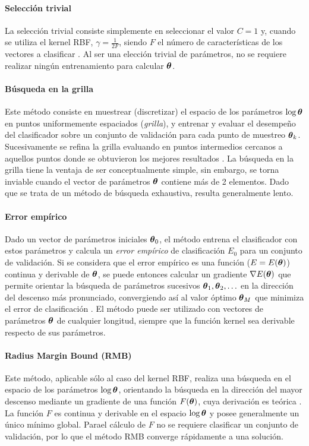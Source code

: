 \documentclass[12pt,bibliography=oldstyle,DIV=12,parskip=half-]{scrreprt}
\begin{document}
\paragraph{Selección trivial}
La selección trivial consiste simplemente en seleccionar el valor
$C=1$ y, cuando se utiliza el kernel RBF, $\gamma=\frac{1}{2F}$,
siendo $F$ el número de características de los vectores a clasificar
\cite{glasmachersigel}. Al ser una elección trivial de parámetros, no
se requiere realizar ningún entrenamiento para calcular $\boldsymbol{\theta}$.
%
%
\paragraph{Búsqueda en la grilla}
Este método consiste en muestrear (discretizar) el espacio de los
parámetros $\log\boldsymbol{\theta}$ en puntos uniformemente espaciados
(\emph{grilla}), y entrenar y evaluar el desempeño del clasificador
sobre un conjunto de validación para cada punto de muestreo
$\boldsymbol{\theta}_k$.  Sucesivamente se refina la grilla evaluando en puntos
intermedios cercanos a aquellos puntos donde se obtuvieron los mejores
resultados \cite{hsu}.
La búsqueda en la grilla tiene la ventaja de ser conceptualmente
simple, sin embargo, se torna inviable cuando el vector de parámetros
$\boldsymbol{\theta}$ contiene más de 2 elementos. Dado que se trata de un
método de búsqueda exhaustiva, resulta generalmente lento.
%
%
\paragraph{Error empírico}
Dado un vector de parámetros iniciales $\boldsymbol{\theta}_0$, el método
entrena el clasificador con estos parámetros y calcula un \emph{error
  empírico} de clasificación $E_0$ \cite{ayat} para un conjunto de validación.
Si
se considera que el error empírico es una función ($E=E(\boldsymbol{\theta})$) continua y
derivable de $\boldsymbol{\theta}$, se puede entonces calcular un gradiente
$\nabla E(\boldsymbol{\theta})$ \cite{keerthi} %
que permite orientar la búsqueda de parámetros sucesivos
$\boldsymbol{\theta}_1,\boldsymbol{\theta}_2,\ldots$ en la dirección del descenso más pronunciado,
convergiendo así al valor óptimo $\boldsymbol{\theta}_M$ que minimiza el error
de clasificación \cite{adankon,glasmachersigel}.
El método puede ser utilizado con vectores de parámetros
$\boldsymbol{\theta}$ de cualquier longitud, siempre que la función kernel sea
derivable respecto de sus parámetros.
%
%
\paragraph{Radius Margin Bound (RMB)}
Este método, aplicable sólo al caso del kernel RBF, realiza una
búsqueda en el espacio de los parámetros $\log\boldsymbol{\theta}$, orientando
la búsqueda en la dirección del mayor descenso mediante un gradiente
de una función $F(\boldsymbol{\theta})$, cuya derivación es teórica \cite{chung}.
La función $F$ es continua y derivable en el espacio $\log\boldsymbol\theta$
y posee generalmente un único mínimo global. Parael cálculo de $F$
no se requiere clasificar un conjunto de validación, por lo que
el método RMB converge rápidamente a una solución.
%
%
\end{document}
